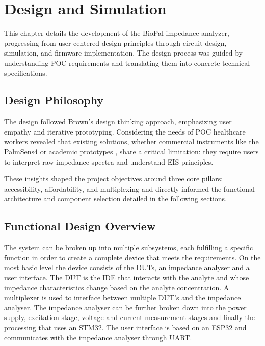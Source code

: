 \graphicspath{{design/fig/}}

\chapter{Design and Simulation}\label{chap:design}
This chapter details the development of the BioPal impedance analyzer, progressing from user-centered design principles through circuit design, simulation, and firmware implementation. The design process was guided by understanding POC requirements and translating them into concrete technical specifications.

\section{Design Philosophy}

The design followed Brown's design thinking approach\cite{brownDesignThinking2008}, emphasizing user empathy and iterative prototyping. Considering the needs of \ac{POC} healthcare workers revealed that existing solutions, whether commercial instruments like the PalmSens4 or academic prototypes \cite{buscagliaSimpleZLowCostPortable2023}\cite{ al-aliDesignPortableLowCost2017}, share a critical limitation: they require users to interpret raw impedance spectra and understand EIS principles.

These insights shaped the project objectives around three core pillars: accessibility, affordability, and multiplexing and directly informed the functional architecture and component selection detailed in the following sections.

\section{Functional Design Overview}
The system can be broken up into multiple subsystems, each fulfilling a specific function in order to create a complete device that meets the requirements. On the most basic level the device consists of the \acp{DUT}, an impedance analyser and a user interface. The DUT is the \ac{IDE} that interacts with the analyte and whose impedance characteristics change based on the analyte concentration. A multiplexer is used to interface between multiple DUT's and the impedance analyser. The impedance analyser can be further broken down into the power supply, excitation stage, voltage and current measurement stages and finally the processing that uses an STM32. The user interface is based on an ESP32 and communicates with the impedance analyser through UART.

